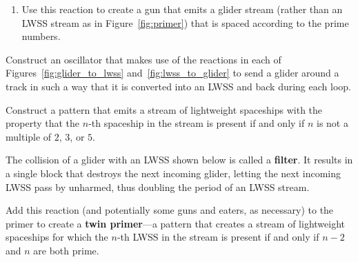 \begin{multicols}{2}
\begin{problem}
\begin{enumerate}[label=\bf\color{ocre}(\alph*)]
			\item {} Use this reaction to create a gun that emits a glider stream (rather than an LWSS stream as in Figure~\ref{fig:primer}) that is spaced according to the prime numbers.
		\end{enumerate}
	\end{problem}
	
	
	\mfilbreak
	
	
	\begin{problem}\label{exer:glider_to_lwss_loop} 
		Construct an oscillator that makes use of the reactions in each of Figures~\ref{fig:glider_to_lwss} and~\ref{fig:lwss_to_glider} to send a glider around a track in such a way that it is converted into an LWSS and back during each loop.
	\end{problem}
	
	
	\mfilbreak
	
	
	\begin{problem}\label{exer:period_not_235_gun} 
		Construct a pattern that emits a stream of lightweight spaceships with the property that the $n$-th spaceship in the stream is present if and only if $n$ is not a multiple of $2$, $3$, or $5$.
	\end{problem}
	
	
	\mfilbreak
	
	
	\begin{problem}\label{exer:twin_primer} 
		The collision of a glider with an LWSS shown below is called a \textbf{filter}. It results in a single block that destroys the next incoming glider, letting the next incoming LWSS pass by unharmed, thus doubling the period of an LWSS stream.
		
		\begin{center}
		\end{center}
		
		\noindent Add this reaction (and potentially some guns and eaters, as necessary) to the primer to create a \textbf{twin primer}---a pattern that creates a stream of lightweight spaceships for which the $n$-th LWSS in the stream is present if and only if $n-2$ and $n$ are both prime.
	\end{problem}



\end{multicols}
